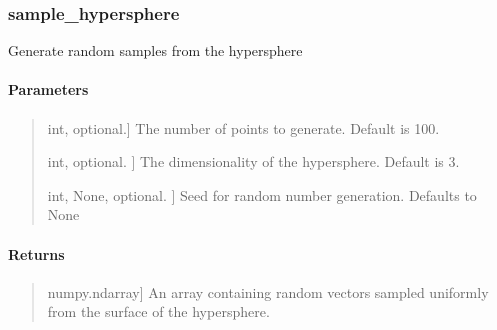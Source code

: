 \documentclass[letterpaper,10pt,english,openany,oneside]{sphinxmanual}
\begin{document}
\sphinxstepscope


\subsubsection{sample\_hypersphere}
\label{\detokenize{api_reference/generated/QuadratiK.tools.sample_hypersphere:sample-hypersphere}}\label{\detokenize{api_reference/generated/QuadratiK.tools.sample_hypersphere::doc}}

\begin{fulllineitems}
\label{\detokenize{api_reference/generated/QuadratiK.tools.sample_hypersphere:QuadratiK.tools.sample_hypersphere}}
\pysigstartsignatures
{}
\pysigstopsignatures
\sphinxAtStartPar
Generate random samples from the hypersphere


\paragraph{Parameters}
\label{\detokenize{api_reference/generated/QuadratiK.tools.sample_hypersphere:parameters}}\begin{quote}
\begin{description}
\sphinxlineitem{npoints}{[}int, optional.{]}
\sphinxAtStartPar
The number of points to generate. 
Default is 100.

\sphinxlineitem{ndim}{[}int, optional. {]}
\sphinxAtStartPar
The dimensionality of the hypersphere.
Default is 3.

\sphinxlineitem{random\_state}{[}int, None, optional. {]}
\sphinxAtStartPar
Seed for random number generation. Defaults to None

\end{description}
\end{quote}


\paragraph{Returns}
\label{\detokenize{api_reference/generated/QuadratiK.tools.sample_hypersphere:returns}}\begin{quote}
\begin{description}
\sphinxlineitem{data on sphere}{[}numpy.ndarray{]}
\sphinxAtStartPar
An array containing random vectors sampled uniformly 
from the surface of the hypersphere.


\end{description}
\end{quote}
\end{fulllineitems}
\end{document}

